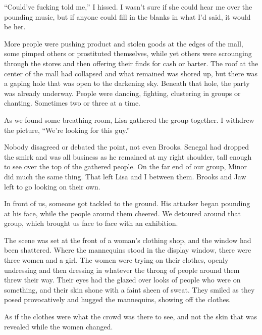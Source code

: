 ``Could've fucking told me,'' I hissed.  I wasn't sure if she could hear me over the pounding music, but if anyone could fill in the blanks in what I'd said, it would be her.



More people were pushing product and stolen goods at the edges of the mall, some pimped others or prostituted themselves, while yet others were scrounging through the stores and then offering their finds for cash or barter.  The roof at the center of the mall had collapsed and what remained was shored up, but there was a gaping hole that was open to the darkening sky.  Beneath that hole, the party was already underway.  People were dancing, fighting, clustering in groups or chanting.  Sometimes two or three at a time.



As we found some breathing room, Lisa gathered the group together.  I withdrew the picture, ``We're looking for this guy.''



Nobody disagreed or debated the point, not even Brooks.  Senegal had dropped the smirk and was all business as he remained at my right shoulder, tall enough to see over the top of the gathered people.  On the far end of our group, Minor did much the same thing.  That left Lisa and I between them.  Brooks and Jaw left to go looking on their own.



In front of us, someone got tackled to the ground.  His attacker began pounding at his face, while the people around them cheered.  We detoured around that group, which brought us face to face with an exhibition.



The scene was set at the front of a woman's clothing shop, and the window had been shattered.  Where the mannequins stood in the display window, there were three women and a girl.  The women were trying on their clothes, openly undressing and then dressing in whatever the throng of people around them threw their way.  Their eyes had the glazed over looks of people who were on something, and their skin shone with a faint sheen of sweat.  They smiled as they posed provocatively and hugged the mannequins, showing off the clothes.



As if the clothes were what the crowd was there to see, and not the skin that was revealed while the women changed.



